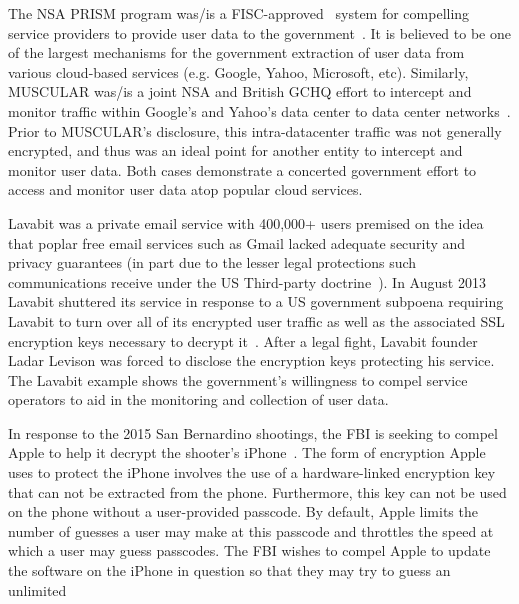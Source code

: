 \begin{packed_desc}
\item[PRISM and MUSCULAR:] The NSA PRISM program was/is a
  FISC-approved~\cite{fisc} system for compelling service providers to
  provide user data to the government~\cite{greenwald-prism}. It is
  believed to be one of the largest mechanisms for the government
  extraction of user data from various cloud-based services
  (e.g. Google, Yahoo, Microsoft, etc). Similarly, MUSCULAR was/is a
  joint NSA and British GCHQ effort to intercept and monitor traffic
  within Google's and Yahoo's data center to data center
  networks~\cite{gellman-muscular}. Prior to MUSCULAR's disclosure,
  this intra-datacenter traffic was not generally encrypted, and thus
  was an ideal point for another entity to intercept and monitor user
  data. Both cases demonstrate a concerted government effort to access
  and monitor user data atop popular cloud services.
\item[Lavabit:] Lavabit was a private email service with 400,000+
  users premised on the idea that poplar free email services such as
  Gmail lacked adequate security and privacy guarantees (in part due
  to the lesser legal protections such communications receive under
  the US Third-party doctrine~\cite{scotus-usvmiller-privacy,
    scotus-smithvmaryland}). In August 2013 Lavabit shuttered its
  service in response to a US government subpoena requiring Lavabit to
  turn over all of its encrypted user traffic as well as the
  associated SSL encryption keys necessary to decrypt
  it~\cite{lavabit, levsion-lavabit}. After a legal fight, Lavabit
  founder Ladar Levison was forced to disclose the encryption keys
  protecting his service. The Lavabit example shows the government's
  willingness to compel service operators to aid in the monitoring and
  collection of user data.
\item[Apple v. FBI:] In response to the 2015 San Bernardino shootings,
  the FBI is seeking to compel Apple to help it decrypt the shooter's
  iPhone~\cite{ars-cookvfbi}. The form of encryption Apple uses to
  protect the iPhone involves the use of a hardware-linked encryption
  key that can not be extracted from the phone. Furthermore, this key
  can not be used on the phone without a user-provided passcode. By
  default, Apple limits the number of guesses a user may make at this
  passcode and throttles the speed at which a user may guess
  passcodes. The FBI wishes to compel Apple to update the software on
  the iPhone in question so that they may try to guess an unlimited

\end{packed_desc}

